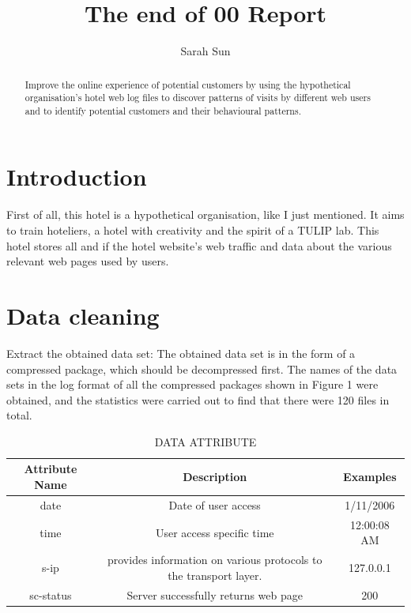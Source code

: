 \documentclass{amsart}
\begin{document}
\title[Group 00]{The end of 00 Report}%
\author{Sarah Sun}
\address[A.~1]{School of business and law,\\ 
Deakin University,Burwood, VIC}%
%
\date{\gitAuthorDate}%
\begin{abstract}
	Improve the online experience of potential customers by using the hypothetical organisation's hotel web log files to discover patterns of visits by different web users and to identify potential customers and their behavioural patterns.
\end{abstract}
%
\maketitle
\tableofcontents
\newpage
\section{Introduction}\label{sec-intro}
First of all, this hotel is a hypothetical organisation, like I just mentioned. It aims to train hoteliers, a hotel with creativity and the spirit of a TULIP lab. This hotel stores all and if the hotel website's web traffic and data about the various relevant web pages used by users.

\section{Data cleaning}\label{sec-intro}

Extract the obtained data set: The obtained data set is in the form of a compressed package, which should be decompressed first.
The names of the data sets in the log format of all the compressed packages shown in Figure 1 were obtained, and the statistics were carried out to find that there were 120 files in total.

\begin{table}  \centering
	\caption{DATA ATTRIBUTE}
	\label{tbl:overall-experiments}
	\begin{tabular}{ccc}
		\toprule
		Attribute Name &Description& Examples \\
		\midrule
		date & Date of user access & 1/11/2006 \\
		time & User access specific time & 12:00:08 AM \\
		s-ip &provides information on various protocols to the transport layer. & 127.0.0.1 \\
		sc-status & Server successfully returns web page & 200\\
		
		\bottomrule
	\end{tabular}
\end{table}
\end{document}
